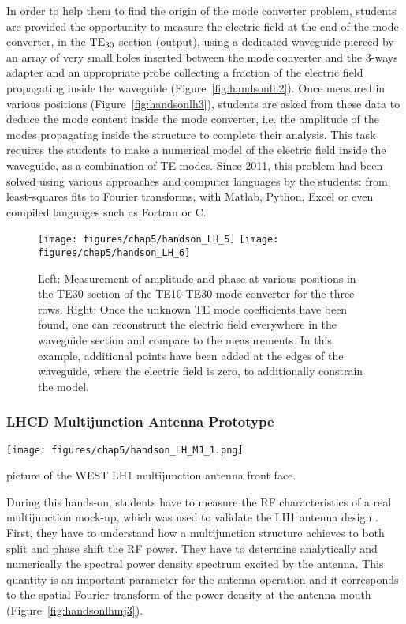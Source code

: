 In order to help them to find the origin of the mode converter problem, students are provided the opportunity to measure the electric field at the end of the mode converter, in the ${\mathrm{TE}}_{30}$ section (output), using a dedicated waveguide pierced by an array of very small holes inserted between the mode converter and the 3-ways adapter and an appropriate probe collecting a fraction of the electric field propagating inside the waveguide (Figure~\ref{fig:handsonlh2}). Once measured in various positions (Figure~\ref{fig:handsonlh3}), students are asked from these data to deduce the mode content inside the mode converter, i.e. the amplitude of the modes propagating inside the structure to complete their analysis. This task requires the students to make a numerical model of the electric field inside the waveguide, as a combination of TE modes. Since 2011, this problem had been solved using various approaches and computer languages by the students: from least-squares fits to Fourier transforms, with Matlab, Python, Excel or even compiled languages such as Fortran or C. 


\begin{figure*}
	\centering
	\texttt{[image: figures/chap5/handson\_LH\_5]}
	\texttt{[image: figures/chap5/handson\_LH\_6]}
	\caption{Left: Measurement of amplitude and phase at various positions in the TE30 section of the TE10-TE30 mode converter for the three rows. Right: Once the unknown TE mode coefficients have been found, one can reconstruct the electric field everywhere in the waveguide section and compare to the measurements. In this example, additional points have been added at the edges of the waveguide, where the electric field is zero, to additionally constrain the model.}
	\label{fig:handsonlh5}
\end{figure*}


\subsubsection{LHCD Multijunction Antenna Prototype}

\begin{marginfigure}
	\centering
	\texttt{[image: figures/chap5/handson\_LH\_MJ\_1.png]}
	\caption{picture of the WEST LH1 multijunction antenna front face.}
	\label{fig:handsonlhmj1}
\end{marginfigure}

During this hands-on, students have to measure the RF characteristics of a real multijunction mock-up, which was used to validate the LH1 antenna design \cite{bibet2000}. First, they have to understand how a multijunction structure achieves to both split and phase shift the RF power. They have to determine analytically and numerically the spectral power density spectrum excited by the antenna. This quantity is an important parameter for the antenna operation and it corresponds to the spatial Fourier transform of the power density at the antenna mouth (Figure~\ref{fig:handsonlhmj3}).

